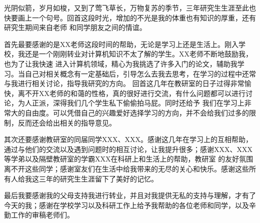 
\thesisacknowledgement
光阴似箭，岁月如梭，又到了莺飞草长，万物复苏的季节，三年研究生生涯至此也快要画上一个句号。回首这段时光，增加的不光是我的体重也有知识的厚重，还有研究生期间来自老师
和同学朋友之间的情谊。

首先最要感谢的是XX老师这段时间的帮助，无论是学习上还是生活上。刚入学校，我还是一个刚刚转业对计算机知识不太了解的学生。XX老师不断地鼓励我，也为了让我快速
进入计算机领域，精心为我挑选了许多入门的论文，辅助我学习。当自己对相关概念有一定基础后，引导怎么去我去思考，在学习的过程中还常与我进行相关讨论，指导我研究的方向。
回首这几年在教研室的日子过得非常愉快，离不开XX老师的和蔼的性格，真的很好进行交流，有什么问题都可以进行讨论，为人正派，深得我们几个学生私下偷偷拍马屁。同时还给予
我们在学习上非常大的自由度。可以凭借自己的兴趣爱好选择学习的方向，并不会给我们过多的限制，反而还会给出相关的指导意见。

其次还要感谢教研室的同届同学XXX、XXX。感谢这几年在学习上的互相帮助，通过与他们的交流以及遇到问题时的相互讨论，让我提升很多；感谢XXX、XXX等学弟以及隔壁教研室的学霸XXX在科研上和生活上的帮助，教研室
的友好氛围离不开这些同学；感谢室友们在生活中给我带来的无尽的关心和快乐。感谢这些所有人给我这三年的研究生生涯留下了美好的记忆。

最后我要感谢我的父母支持我进行转业，并且对我提供无私的支持与理解，才有了今天的我；感谢在学校学习以及科研工作上给予我帮助的各位老师和同学，以及辛勤工作的审稿老师们。
